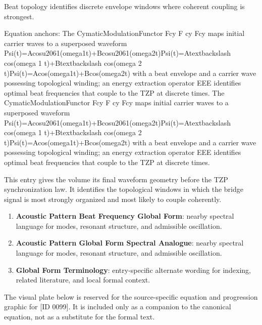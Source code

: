 Beat topology identifies discrete envelope windows where coherent coupling is strongest.

Equation anchors: The CymaticModulationFunctor Fcy F cy Fcy maps initial carrier waves to a superposed waveform Psi(t)=Acosu2061(omega1t)+Bcosu2061(omega2t)Psi(t)=Atextbackslash cos(omega 1 t)+Btextbackslash cos(omega 2 t)Psi(t)=Acos(omega1t)+Bcos(omega2t) with a beat envelope and a carrier wave possessing topological winding; an energy extraction operator EEE identifies optimal beat frequencies that couple to the TZP at discrete times. The CymaticModulationFunctor Fcy F cy Fcy maps initial carrier waves to a superposed waveform Psi(t)=Acosu2061(omega1t)+Bcosu2061(omega2t)Psi(t)=Atextbackslash cos(omega 1 t)+Btextbackslash cos(omega 2 t)Psi(t)=Acos(omega1t)+Bcos(omega2t) with a beat envelope and a carrier wave possessing topological winding; an energy extraction operator EEE identifies optimal beat frequencies that couple to the TZP at discrete times.

This entry gives the volume its final waveform geometry before the TZP synchronization law. It identifies the topological windows in which the bridge signal is most strongly organized and most likely to couple coherently.
\endgroup

\begingroup\footnotesize\sloppy
\begin{enumerate}[leftmargin=1.35em,itemsep=1pt,topsep=1pt,parsep=0pt]
\item \textbf{Acoustic Pattern Beat Frequency Global Form}: nearby spectral language for modes, resonant structure, and admissible oscillation.
\item \textbf{Acoustic Pattern Global Form Spectral Analogue}: nearby spectral language for modes, resonant structure, and admissible oscillation.
\item \textbf{Global Form Terminology}: entry-specific alternate wording for indexing, related literature, and local formal context.
\end{enumerate}
\endgroup

\begingroup\footnotesize\sloppy
The visual plate below is reserved for the source-specific equation and progression graphic for [ID 0099]. It is included only as a companion to the canonical equation, not as a substitute for the formal text.
\par\endgroup
\ifTZPDarkEdition
{}
\fi

